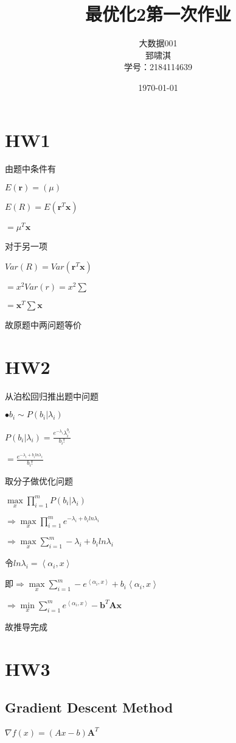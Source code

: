 \documentclass[12pt, a4paper, oneside, fontset=windows]{ctexart}
\title{\textbf{最优化2第一次作业}}
\author{大数据001\\郅啸淇\\学号：2184114639}
\date{\today}
\begin{document}
\maketitle
\newpage
\tableofcontents
\newpage
\section{HW1}
由题中条件有

$E(\textbf{r}) = (\mu)$

$ E(R) = E(\textbf{r}^{T} \textbf{x}) $

$= \mu^{T} \textbf{x}$

对于另一项

$Var(R) = Var(\textbf{r}^{T}\textbf{x})$

$= x^{2}Var(r) = x^{2} \sum $

$=\textbf{x}^{T}\sum \textbf{x}$

故原题中两问题等价
\section{HW2}
从泊松回归推出题中问题

$\bullet b_{i}\sim P(b_{i} |\lambda_{i})$

$P(b_{i} |\lambda_{i}) = \frac{e^{-\lambda_{i}}\lambda^{b_{i}}_{i}}{b_{i}!}$

$=\frac{e^{-\lambda_{i}+b_{i}ln\lambda_{i}}}{b_{i}!}$

取分子做优化问题

$\mathop{max}\limits_{x} \prod_{i=1}^{m} P(b_{i} | \lambda_{i})$

$\Rightarrow \mathop{max}\limits_{x} \prod_{i=1}^{m} e^{-\lambda_{i}+b_{i}ln\lambda_{i}}$

$\Rightarrow \mathop{max}\limits_{x} \sum_{i=1}^{m} -\lambda_{i}+b_{i}ln\lambda_{i}$

令$ln\lambda_{i} = \left \langle \alpha_{i},x \right \rangle$

即$\Rightarrow \mathop{max}\limits_{x} \sum_{i=1}^{m} -e^{\left \langle \alpha_{i},x \right \rangle} + b_{i}\left \langle \alpha_{i},x \right \rangle$

$\Rightarrow \mathop{min}\limits_{x} \sum_{i=1}^{m} e^{\left \langle \alpha_{i},x \right \rangle} - \textbf{b}^{T}\textbf{Ax}$

故推导完成
\section{HW3}
\subsection{Gradient Descent Method}
$\nabla f(x) = (Ax-b)\textbf{A}^{T}$
\end{document}
